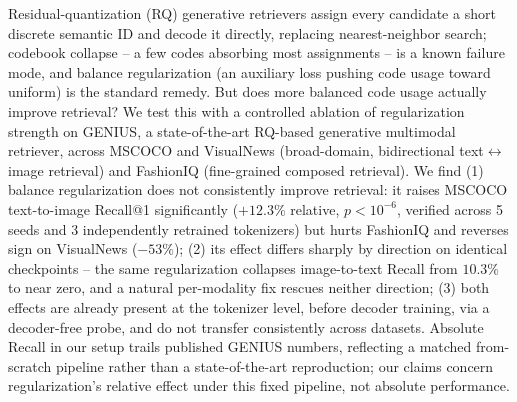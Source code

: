 Residual-quantization (RQ) generative retrievers assign every candidate a short discrete semantic ID and decode it directly, replacing nearest-neighbor search; codebook collapse -- a few codes absorbing most assignments -- is a known failure mode, and balance regularization (an auxiliary loss pushing code usage toward uniform) is the standard remedy. But does more balanced code usage actually improve retrieval? We test this with a controlled ablation of regularization strength on GENIUS, a state-of-the-art RQ-based generative multimodal retriever, across MSCOCO and VisualNews (broad-domain, bidirectional text$\leftrightarrow$image retrieval) and FashionIQ (fine-grained composed retrieval). We find (1) balance regularization does not consistently improve retrieval: it raises MSCOCO text-to-image Recall@1 significantly ($+12.3\%$ relative, $p<10^{-6}$, verified across 5 seeds and 3 independently retrained tokenizers) but hurts FashionIQ and reverses sign on VisualNews ($-53\%$); (2) its effect differs sharply by direction on identical checkpoints -- the same regularization collapses image-to-text Recall from $10.3\%$ to near zero, and a natural per-modality fix rescues neither direction; (3) both effects are already present at the tokenizer level, before decoder training, via a decoder-free probe, and do not transfer consistently across datasets. Absolute Recall in our setup trails published GENIUS numbers, reflecting a matched from-scratch pipeline rather than a state-of-the-art reproduction; our claims concern regularization's relative effect under this fixed pipeline, not absolute performance.
